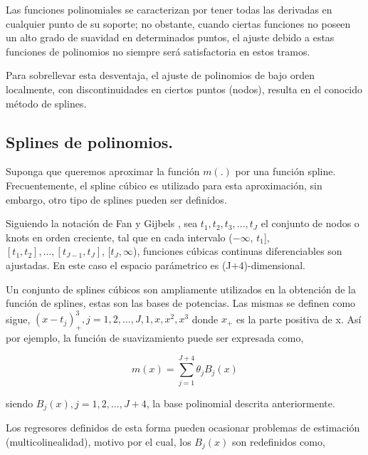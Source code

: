 \hspace*{0.4 cm} Las funciones polinomiales se caracterizan por tener todas las derivadas en cualquier punto de su soporte; no obstante, cuando ciertas funciones no poseen un alto grado de suavidad en determinados puntos, el ajuste debido a estas funciones de polinomios no siempre ser\'a satisfactoria en estos tramos.

\hspace*{0.4 cm} Para sobrellevar esta desventaja, el ajuste de polinomios de bajo orden localmente, con discontinuidades en ciertos puntos (nodos), resulta en el conocido m\'etodo de splines.

\subsection{Splines de polinomios.\\}


\hspace*{0.4 cm}Suponga que queremos aproximar la funci\'on $m(.)$ por una funci\'on spline. Frecuentemente, el spline c\'ubico es utilizado para esta aproximaci\'on, sin embargo, otro tipo de splines pueden ser definidos.


\hspace*{0.4 cm}Siguiendo la notaci\'on de Fan y Gijbels \cite{FG}, sea $t_{1}, t_{2}, t_{3},...,t_{J}$ el conjunto de nodos o knots en orden creciente, tal que en cada intervalo  ($-\infty$, $t_{1}$], $[t_{1}, t_{2}],..., [t_{J-1}, t_{J}]$, [$t_{J}, \infty$), funciones c\'ubicas continuas diferenciables son ajustadas. En este caso el espacio par\'ametrico es (J+4)-dimensional.

\hspace*{0.4 cm} Un conjunto de splines c\'ubicos son ampliamente utilizados en la obtenci\'on de la funci\'on de splines, estas son las bases de potencias. Las mismas se definen como sigue, $(x- t_{j})_{+}^{3}, j= 1,2,...,J,1,x,x^2,x^3$ donde $x_{+}$ es la parte positiva de x. As\'i por ejemplo, la funci\'on de suavizamiento puede ser expresada como,

\begin{equation}
m(x) = \sum_{j=1}^{J+4} \theta_{j}B_{j}(x) 
\label{bases}
\end{equation}

\noindent siendo $B_{j}(x), j = 1, 2,... , J+4$, la base polinomial descrita anteriormente.

\hspace*{0.4 cm} Los regresores definidos de esta forma pueden ocasionar problemas de estimaci\'on (multicolinealidad), motivo por el cual, los $B_{j}(x)$ son
redefinidos como,

